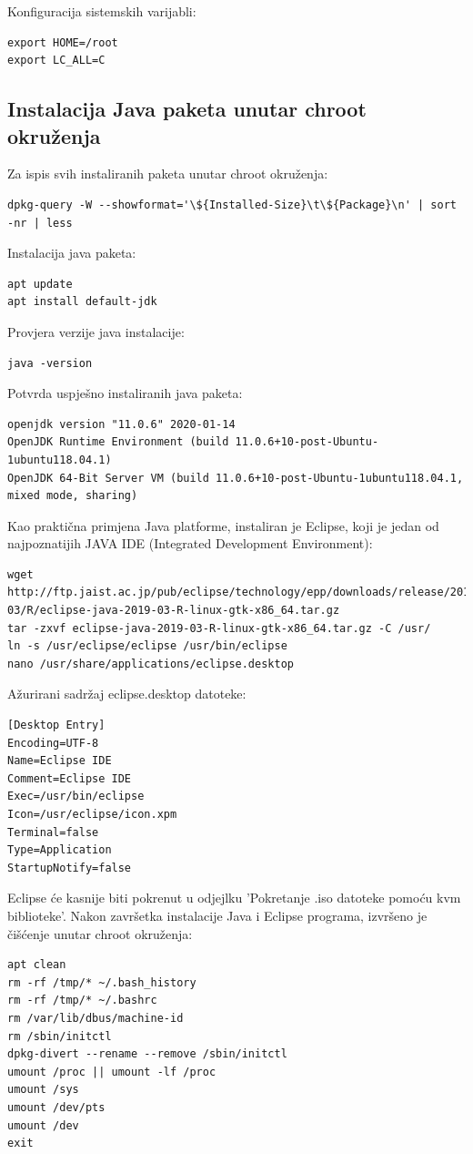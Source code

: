 \documentclass[12pt,vi]{mitthesis}
\begin{document}
\noindent
Konfiguracija sistemskih varijabli:
\begin{lstlisting}[style=BashInputStyle]
export HOME=/root
export LC_ALL=C
\end{lstlisting}

\subsection*{Instalacija Java paketa unutar chroot okruženja}
\noindent
Za ispis svih instaliranih paketa unutar chroot okruženja:
\begin{lstlisting}[style=BashInputStyle]
dpkg-query -W --showformat='\${Installed-Size}\t\${Package}\n' | sort -nr | less
\end{lstlisting}

\noindent
Instalacija java paketa:
\begin{lstlisting}[style=BashInputStyle]
apt update
apt install default-jdk
\end{lstlisting}
Provjera verzije java instalacije:
\begin{lstlisting}[style=BashInputStyle]
java -version
\end{lstlisting}
Potvrda uspješno instaliranih java paketa:
\begin{lstlisting}[style=BashInputStyle]
openjdk version "11.0.6" 2020-01-14
OpenJDK Runtime Environment (build 11.0.6+10-post-Ubuntu-1ubuntu118.04.1)
OpenJDK 64-Bit Server VM (build 11.0.6+10-post-Ubuntu-1ubuntu118.04.1, mixed mode, sharing)
\end{lstlisting}
Kao praktična primjena Java platforme, instaliran je Eclipse, koji je jedan od najpoznatijih JAVA IDE (Integrated Development Environment):
\begin{lstlisting}[style=BashInputStyle]
wget http://ftp.jaist.ac.jp/pub/eclipse/technology/epp/downloads/release/2019-03/R/eclipse-java-2019-03-R-linux-gtk-x86_64.tar.gz
tar -zxvf eclipse-java-2019-03-R-linux-gtk-x86_64.tar.gz -C /usr/
ln -s /usr/eclipse/eclipse /usr/bin/eclipse
nano /usr/share/applications/eclipse.desktop
\end{lstlisting}
Ažurirani sadržaj eclipse.desktop datoteke:
\begin{lstlisting}[style=BashInputStyle]
[Desktop Entry]
Encoding=UTF-8
Name=Eclipse IDE
Comment=Eclipse IDE
Exec=/usr/bin/eclipse
Icon=/usr/eclipse/icon.xpm
Terminal=false
Type=Application
StartupNotify=false
\end{lstlisting}
Eclipse će kasnije biti pokrenut u odjejlku 'Pokretanje .iso datoteke pomoću kvm biblioteke'.
\noindent
Nakon završetka instalacije Java i Eclipse programa, izvršeno je čišćenje unutar chroot okruženja:
\begin{lstlisting}[style=BashInputStyle]
apt clean
rm -rf /tmp/* ~/.bash_history
rm -rf /tmp/* ~/.bashrc
rm /var/lib/dbus/machine-id
rm /sbin/initctl
dpkg-divert --rename --remove /sbin/initctl
umount /proc || umount -lf /proc
umount /sys
umount /dev/pts
umount /dev
exit
\end{lstlisting}
\end{document}

